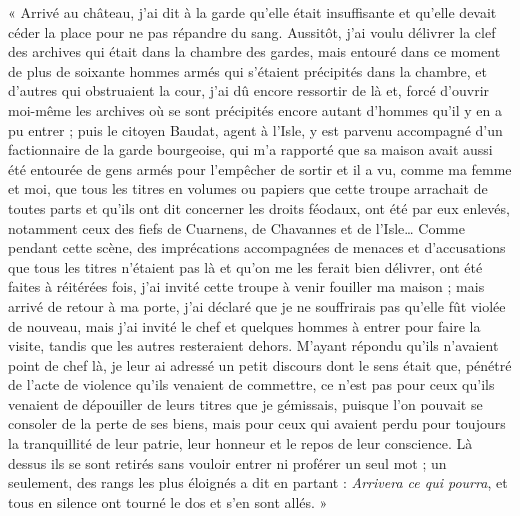 \documentclass[french,twoside]{book} %
\newenvironment{quoteblock}%
  {\begin{quoting}}
  {\end{quoting}}
\newenvironment{quotebar}{%
    \def\FrameCommand{{\color{rubric!10!}\vrule width 0.5em} \hspace{0.9em}}%
    \def\OuterFrameSep{\itemsep} %
    \MakeFramed {\advance\hsize-\width \FrameRestore}
  }%
  {%
    \endMakeFramed
  }
\renewenvironment{quoteblock}%
  {%
    \savenotes
    \setstretch{0.9}
    \begin{quotebar}
  }
  {%
    \end{quotebar}
    \spewnotes
  }
\begin{document}
\begin{quoteblock}
 \noindent « Arrivé au château, j’ai dit à la garde qu’elle était insuffisante et qu’elle devait céder la place pour ne pas répandre du sang. Aussitôt, j’ai voulu délivrer la clef des archives qui était dans la chambre des gardes, mais entouré dans ce moment de plus de soixante hommes armés qui s’étaient précipités dans la chambre, et d’autres qui obstruaient la cour, j’ai dû encore ressortir de là et, forcé d’ouvrir moi-même les archives où se sont précipités encore autant d’hommes qu’il y en a pu entrer ; puis le citoyen Baudat, agent à l’Isle, y est parvenu accompagné d’un factionnaire de la garde bourgeoise, qui m’a rapporté que sa maison avait aussi été entourée de gens armés pour l’empêcher de sortir et il a vu, comme ma femme et moi, que tous les titres en volumes ou papiers que cette troupe arrachait de toutes parts et qu’ils ont dit concerner les droits féodaux, ont été par eux enlevés, notamment ceux des fiefs de Cuarnens, de Chavannes et de l’Isle… Comme pendant cette scène, des imprécations accompagnées de menaces et d’accusations que tous les titres n’étaient pas là et qu’on me les ferait bien délivrer, ont été faites à réitérées fois, j’ai invité cette troupe à venir fouiller ma maison ; mais arrivé de retour à ma porte, j’ai déclaré que je ne souffrirais pas qu’elle fût violée de nouveau, mais j’ai invité le chef et quelques hommes à entrer pour faire la visite, tandis que les autres resteraient dehors. M’ayant répondu qu’ils n’avaient point de chef là, je leur ai adressé un petit discours dont le sens était que, pénétré de l’acte de violence qu’ils venaient de commettre, ce n’est pas pour ceux qu’ils venaient de dépouiller de leurs titres que je gémissais, puisque l’on pouvait se consoler de la perte de ses biens, mais pour ceux qui avaient perdu pour toujours la tranquillité de leur patrie, leur honneur et le repos de leur conscience. Là dessus ils se sont retirés sans vouloir entrer ni proférer un seul mot ; un seulement, des rangs les plus éloignés a dit en partant : \emph{Arrivera ce qui pourra}, et tous en silence ont tourné le dos et s’en sont allés. »
 \end{quoteblock}
\end{document}
